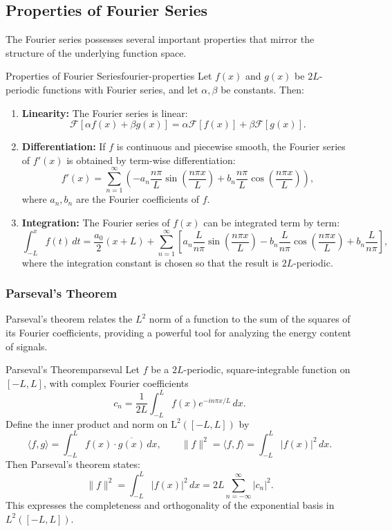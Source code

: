 \subsection{Properties of Fourier Series}
The Fourier series possesses several important properties that mirror the structure of the underlying function space.
\begin{property}{Properties of Fourier Series}{fourier-properties}
    Let \( f(x) \) and \( g(x) \) be \( 2L \)-periodic functions with Fourier series, and let \( \alpha, \beta \) be constants. Then:
    \begin{enumerate}[label=\textbf{\arabic*.}, leftmargin=*, noitemsep]
        \item \textbf{Linearity:} The Fourier series is linear:
              \[
                  \mathcal{F}[\alpha f(x) + \beta g(x)] = \alpha \mathcal{F}[f(x)] + \beta \mathcal{F}[g(x)].
              \]
        \item \textbf{Differentiation:} If \( f \) is continuous and piecewise smooth, the Fourier series of \( f'(x) \) is obtained by term-wise differentiation:
              \[
                  f'(x) = \sum_{n=1}^{\infty} \left( -a_n \frac{n\pi}{L} \sin\left(\frac{n\pi x}{L}\right) + b_n \frac{n\pi}{L} \cos\left(\frac{n\pi x}{L}\right) \right),
              \]
              where \( a_n, b_n \) are the Fourier coefficients of \( f \).
        \item \textbf{Integration:} The Fourier series of \( f(x) \) can be integrated term by term:
              \[
                  \int_{-L}^{x} f(t)\,dt = \frac{a_0}{2}(x + L) + \sum_{n=1}^{\infty} \left[ a_n \frac{L}{n\pi} \sin\left(\frac{n\pi x}{L}\right) - b_n \frac{L}{n\pi} \cos\left(\frac{n\pi x}{L}\right) + b_n \frac{L}{n\pi} \right],
              \]
              where the integration constant is chosen so that the result is \( 2L \)-periodic.
    \end{enumerate}
\end{property}

\subsubsection{Parseval's Theorem}
Parseval's theorem relates the \(L^2\) norm of a function to the sum of the squares of its Fourier coefficients, providing a powerful tool for analyzing the energy content of signals.
\begin{theorem}{Parseval's Theorem}{parseval}
    Let \( f \) be a \( 2L \)-periodic, square-integrable function on \([-L, L]\), with complex Fourier coefficients
    \[
        c_n = \frac{1}{2L} \int_{-L}^{L} f(x) e^{-i n \pi x / L} \, dx.
    \]
    Define the inner product and norm on \( \mathrm{L}^2([-L, L]) \) by
    \[
        \langle f, g \rangle = \int_{-L}^{L} f(x) \cdot \overline{g(x)} \, dx, \qquad \|f\|^2 = \langle f, f \rangle = \int_{-L}^{L} |f(x)|^2 \, dx.
    \]
    Then Parseval's theorem states:
    \[
        \|f\|^2 = \int_{-L}^{L} |f(x)|^2 \, dx = 2L \sum_{n=-\infty}^{\infty} |c_n|^2.
    \]
    This expresses the completeness and orthogonality of the exponential basis in \( L^2([-L, L]) \).
\end{theorem}

